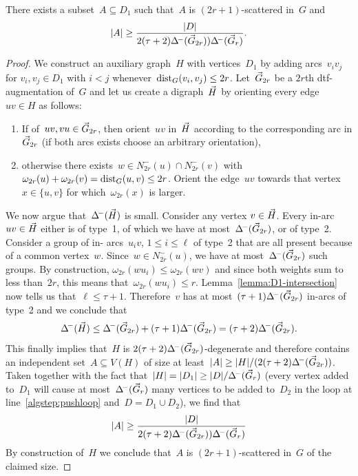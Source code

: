 \begin{lemma}
  There exists a subset~$A \subseteq D_1$ such that~$A$ is
  $(2r+1)$-scattered in~$G$ and
  \[
  	|A| \geq \frac{|D|}{2(\tau+2)\Delta^{\!-}(\vec{G}_{2r}))\Delta^{\!-}(\vec{G}_r)}.
  \]
\end{lemma}
\begin{proof}
  We construct an auxiliary graph~$H$ with vertices~$D_1$ by
  adding arcs~$v_iv_j$ for $v_i,v_j \in D_1$ with $i < j$
  whenever~$\text{dist}_G(v_i,v_j) \leq 2r$.
  Let~$\vec{G}_{2r}$ be a $2r$th dtf-augmentation of~$G$ and
  let us create a digraph~$\vec{H}$ by orienting
  every edge~$uv \in H$ as follows:
  \begin{enumerate}
    \item If of~$uv,vu \in \vec{G}_{2r}$,
          then orient~$uv$ in~$\vec{H}$ according to the corresponding
          arc in $\vec{G}_{2r}$ (if both arcs exists choose an arbitrary
          orientation),
    \item otherwise there exists~$w \in N^-_{2r}(u) \cap N^-_{2r}(v)$
          with~$\omega_{2r}(u) + \omega_{2r}(v) = \text{dist}_G(u,v) \leq 2r$. Orient the edge~$uv$ towards that vertex~$x \in \{u,v\}$
          for which~$\omega_{2r}(x)$ is larger.
  \end{enumerate}
  We now argue that~$\Delta^{\!-}(\vec{H})$ is small. Consider any vertex $v \in
  \vec{H}$. Every in-arc $uv \in \vec{H}$ either is of type~1, of which we have
  at most~$\Delta^{\!-}(\vec{G}_{2r})$, or of type~2. Consider a group of in-
  arcs~$u_iv$, $1 \leq i \leq \ell$ of type~2 that are all present because of
  a common vertex~$w$. Since~$w \in N^-_{2r}(u)$, we have at
  most~$\Delta^{\!-}(\vec{G}_{2r})$ such groups. By construction,
  $\omega_{2r}(wu_i) \leq \omega_{2r}(wv)$ and since both weights sum to less
  than~$2r$, this means that~$\omega_{2r}(wu_i) \leq r$.
  Lemma~\ref{lemma:D1-intersection} now tells us that~$\ell \leq \tau + 1$.
  Therefore~$v$ has at most~$(\tau+1) \Delta^{\!-}(\vec{G}_{2r})$ in-arcs of type~2 and we conclude that
  \[
    \Delta^{\!-}(\vec{H}) \leq \Delta^{\!-}(\vec{G}_{2r}) + (\tau+1)\Delta^{\!-}(\vec{G}_{2r}) = (\tau+2)\Delta^{\!-}(\vec{G}_{2r}).
  \]
  This finally implies that~$H$ is $2(\tau+2)\Delta^{\!-}(\vec{G}_{2r})$-degenerate and therefore contains an independent set~$A \subseteq V(H)$
  of size at least~$|A| \geq |H| / (2(\tau+2)\Delta^{\!-}(\vec{G}_{2r}))$.
  Taken together with the fact that~$|H| = |D_1| \geq |D| / \Delta^{\!-}(\vec{G}_r)$
  (every vertex added to~$D_1$ will cause at most~$\Delta^{\!-}(\vec{G}_r)$ many
  vertices to be added to~$D_2$ in the loop at line~\ref{algstep:pushloop}
  and~$D = D_1 \cup D_2$), we find that
  \[
  	|A| \geq \frac{|D|}{2(\tau+2)\Delta^{\!-}(\vec{G}_{2r}))\Delta^{\!-}(\vec{G}_r)}
  \]
  By construction of~$H$ we conclude that~$A$ is $(2r+1)$-scattered
  in~$G$ of the claimed size.
\end{proof}

